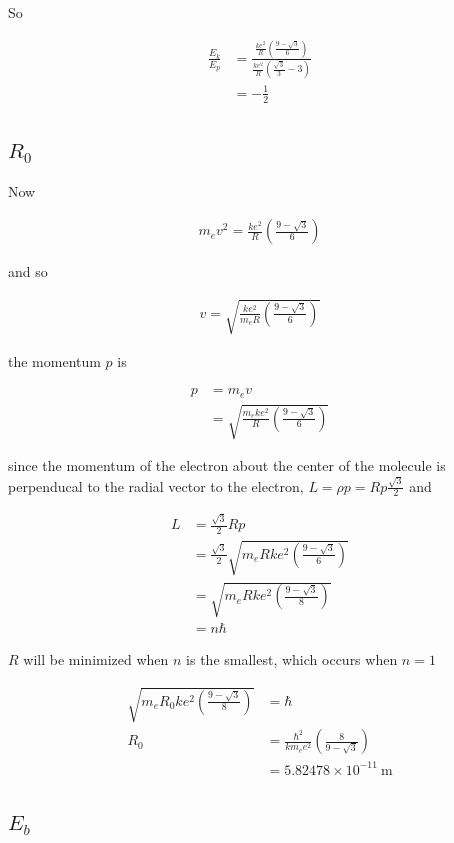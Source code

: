 \documentclass{article}
\begin{document}
So

\begin{align*}
\frac{E_k}{E_p} &= \frac{\frac{ke^2}{R}\left(\frac{9 - \sqrt 3}{6}\right)}{\frac{ke^2}{R} \left(\frac{\sqrt 3}{3} - 3\right)} \\
&= -\frac{1}{2}
\end{align*}

\subsection{$R_0$}

Now

\begin{align*}
m_e v^2 = \frac{ke^2}{R}\left(\frac{9 - \sqrt 3}{6}\right)
\end{align*}

and so

\begin{align*}
v = \sqrt{\frac{ke^2}{m_eR}\left(\frac{9 - \sqrt 3}{6}\right)}
\end{align*}

the momentum $p$ is

\begin{align*}
p &= m_e v \\
&= \sqrt{\frac{m_eke^2}{R}\left(\frac{9 - \sqrt 3}{6}\right)}
\end{align*}

since the momentum of the electron about the center of the molecule is perpenducal to the radial vector to the electron, $L = \rho p = Rp \frac{\sqrt{3}}{2}$ and

\begin{align*}
L &= \frac{\sqrt{3}}{2} R p \\
&= \frac{\sqrt{3}}{2} \sqrt{m_eRke^2\left(\frac{9 - \sqrt 3}{6}\right)} \\
&= \sqrt{m_eRke^2\left(\frac{9 - \sqrt 3}{8}\right)} \\
&= n\hbar
\end{align*}

$R$ will be minimized when $n$ is the smallest, which occurs when $n=1$

\begin{align*}
\sqrt{m_eR_0ke^2\left(\frac{9 - \sqrt 3}{8}\right)} &= \hbar \\
R_0 &= \frac{\hbar^2}{km_e e^2} \left(\frac{8}{9 - \sqrt 3}\right) \\
&= 5.82478 \times 10^{-11}\mathrm{\ m}
\end{align*}

\subsection{$E_b$}
\end{document}
